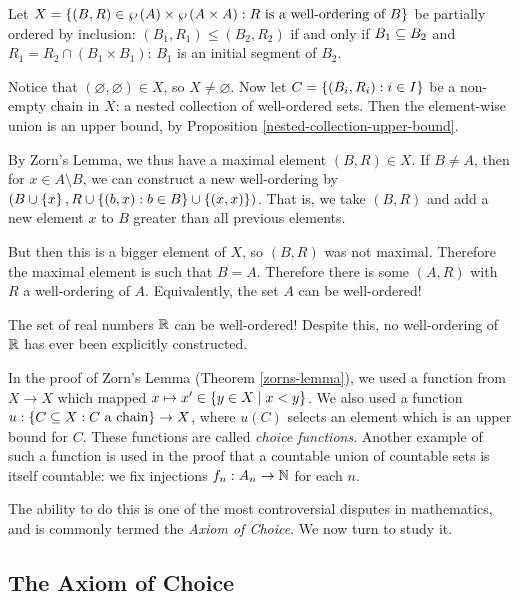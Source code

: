 \documentclass{article}
\begin{document}
\begin{prf}
    Let $X = \left\lbrace (B, R) \in \wp\left(A\right) \times \wp\left(A \times A\right) : R \text{ is a well-ordering of } B \right\rbrace$ be partially ordered by inclusion: $(B_1, R_1) \leq (B_2, R_2)$ if and only if $B_1 \subseteq B_2$ and $R_1 = R_2 \cap (B_1 \times B_1)$: $B_1$ is an initial segment of $B_2$.
    
    Notice that $(\varnothing, \varnothing) \in X$, so $X \neq \varnothing$. Now let $C = \left\lbrace (B_i, R_i) : i \in I \right\rbrace$ be a non-empty chain in $X$: a nested collection of well-ordered sets. Then the element-wise union is an upper bound, by Proposition \ref{nested-collection-upper-bound}.
    
    By Zorn's Lemma, we thus have a maximal element $(B, R) \in X$. If $B \neq A$, then for $x \in A \setminus B$, we can construct a new well-ordering by $(B \cup \left\lbrace x \right\rbrace, R \cup \left\lbrace (b, x) : b \in B \right\rbrace \cup \left\lbrace (x, x) \right\rbrace)$. That is, we take $(B, R)$ and add a new element $x$ to $B$ greater than all previous elements.
    
    But then this is a bigger element of $X$, so $(B, R)$ was not maximal. Therefore the maximal element is such that $B = A$. Therefore there is some $(A, R)$ with $R$ a well-ordering of $A$. Equivalently, the set $A$ can be well-ordered!
\end{prf}

\begin{corollary}
    The set of real numbers $\mathbb{R}$ can be well-ordered! Despite this, no well-ordering of $\mathbb{R}$ has ever been explicitly constructed.
\end{corollary}

In the proof of Zorn's Lemma (Theorem \ref{zorns-lemma}), we used a function from $X \to X$ which mapped $x \mapsto x' \in \left\lbrace y \in X \mid x < y \right\rbrace$. We also used a function $u: \left\lbrace C \subseteq X : C \text{ a chain} \right\rbrace \to X$, where $u(C)$ selects an element which is an upper bound for $C$. These functions are called \textit{choice functions}. Another example of such a function is used in the proof that a countable union of countable sets is itself countable: we fix injections $f_n : A_n \to \mathbb{N}$ for each $n$.

The ability to do this is one of the most controversial disputes in mathematics, and is commonly termed the \textit{Axiom of Choice}. We now turn to study it.


\subsection{The Axiom of Choice}
\label{section-posets-axiom-of-choice}
\end{document}
